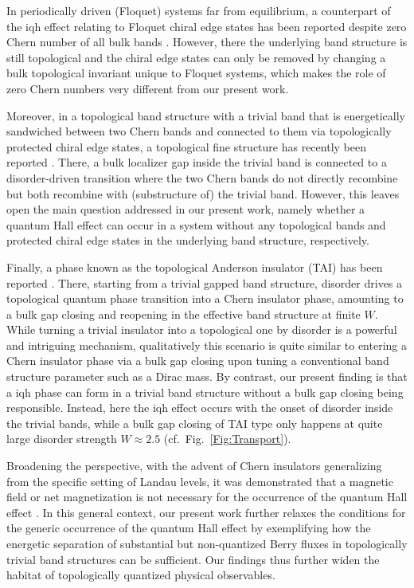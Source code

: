 \documentclass[aps,prl,amsmath,amssymb,twocolumn, superscriptaddress]{revtex4-2}
\begin{document}
In periodically driven (Floquet) systems far from equilibrium, a counterpart of the \gls{iqh} effect relating to Floquet chiral edge states has been reported despite zero Chern number of all bulk bands \cite{Anomalous_Floquet_AI, Anomalous_BBC}. However, there the underlying band structure is still topological and the chiral edge states can only be removed by changing a bulk topological invariant unique to Floquet systems, which makes the role of zero Chern numbers very different from our present work.

Moreover, in a topological band structure with a trivial band that is energetically sandwiched between two Chern bands and connected to them via topologically protected chiral edge states, a topological fine structure has recently been reported \cite{Fine_structure}. There, a bulk localizer gap inside the trivial band is connected to a disorder-driven transition where the two Chern bands do not directly recombine but both recombine with (substructure of) the trivial band. However, this leaves open the main question addressed in our present work, namely whether a quantum Hall effect can occur in a system without any topological bands and protected chiral edge states in the underlying band structure, respectively.

Finally, a phase known as the topological Anderson insulator (TAI) has been reported \cite{TAI, theory_TAI, Mobility_gap_TAI, Disordered_CI_HHH}.
There, starting from a trivial gapped band structure, disorder drives a topological quantum phase transition into a Chern insulator phase, amounting to a bulk gap closing and reopening in the effective band structure at finite $W$. While turning a trivial insulator into a topological one by disorder is a powerful and intriguing mechanism, qualitatively this scenario is quite similar to entering a Chern insulator phase via a bulk gap closing upon tuning a conventional band structure parameter such as a Dirac mass. By contrast, our present finding is that a \gls{iqh} phase can form in a trivial band structure without a bulk gap closing being responsible. Instead, here the \gls{iqh} effect occurs with the onset of disorder inside the trivial bands, while a bulk gap closing of TAI type only happens at quite large disorder strength $W\approx 2.5$ (cf.~Fig.~\ref{Fig:Transport}).

Broadening the perspective, with the advent of Chern insulators generalizing from the specific setting of Landau levels, it was demonstrated that a magnetic field or net magnetization is not necessary for the occurrence of the quantum Hall effect \cite{Haldane_1988}. In this general context, our present work further relaxes the conditions for the generic occurrence of the quantum Hall effect by exemplifying how the energetic separation of substantial but non-quantized Berry fluxes in topologically trivial band structures can be sufficient. Our findings thus further widen the habitat of topologically quantized physical observables.   
\end{document}
